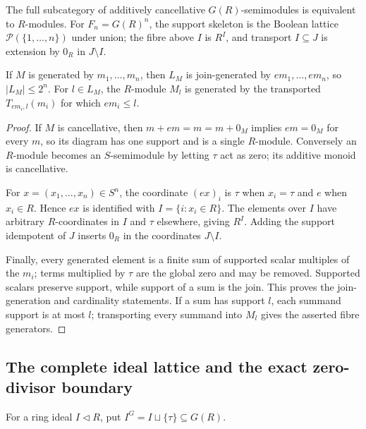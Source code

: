 \begin{corollary}
\label{cor:gcue-cancellative-free}
The full subcategory of additively cancellative $G(R)$-semimodules is equivalent to
$R$-modules.  For $F_n=G(R)^n$, the support skeleton is the Boolean lattice
$\mathcal P(\{1,\dots,n\})$ under union; the fibre above $I$ is $R^I$, and transport
$I\subseteq J$ is extension by $0_R$ in $J\setminus I$.

If $M$ is generated by $m_1,\dots,m_n$, then $L_M$ is join-generated by
$em_1,\dots,em_n$, so $|L_M|\le2^n$.  For $l\in L_M$, the $R$-module $M_l$ is generated
by the transported $T_{em_i,l}(m_i)$ for which $em_i\le l$.
\end{corollary}

\begin{proof}
If $M$ is cancellative, then
$m+em=m=m+0_M$ implies $em=0_M$ for every $m$, so its diagram has one support and is a
single $R$-module.  Conversely an $R$-module becomes an $S$-semimodule by letting
$\tau$ act as zero; its additive monoid is cancellative.

For $x=(x_1,\dots,x_n)\in S^n$, the coordinate $(ex)_i$ is $\tau$ when $x_i=\tau$ and
$e$ when $x_i\in R$.  Hence $ex$ is identified with
$I=\{i:x_i\in R\}$.  The elements over $I$ have arbitrary $R$-coordinates in $I$ and
$\tau$ elsewhere, giving $R^I$.  Adding the support idempotent of $J$ inserts $0_R$ in
the coordinates $J\setminus I$.

Finally, every generated element is a finite sum of supported scalar multiples of the
$m_i$; terms multiplied by $\tau$ are the global zero and may be removed.  Supported
scalars preserve support, while support of a sum is the join.  This proves the join-generation
and cardinality statements.  If a sum has support $l$, each summand support is at most $l$;
transporting every summand into $M_l$ gives the asserted fibre generators.
\end{proof}

\subsection{The complete ideal lattice and the exact zero-divisor boundary}

For a ring ideal $I\lhd R$, put $I^G=I\sqcup\{\tau\}\subseteq G(R)$.

